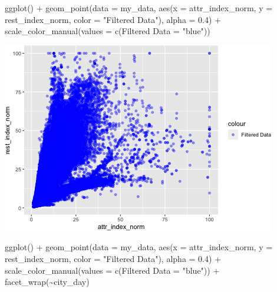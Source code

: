 \documentclass[
]{article}
\newenvironment{Shaded}{\begin{snugshade}}{\end{snugshade}}
\newcommand{\AttributeTok}[1]{\textcolor[rgb]{0.77,0.63,0.00}{#1}}
\newcommand{\FloatTok}[1]{\textcolor[rgb]{0.00,0.00,0.81}{#1}}
\newcommand{\FunctionTok}[1]{\textcolor[rgb]{0.00,0.00,0.00}{#1}}
\newcommand{\NormalTok}[1]{#1}
\newcommand{\OtherTok}[1]{\textcolor[rgb]{0.56,0.35,0.01}{#1}}
\newcommand{\SpecialCharTok}[1]{\textcolor[rgb]{0.00,0.00,0.00}{#1}}
\newcommand{\StringTok}[1]{\textcolor[rgb]{0.31,0.60,0.02}{#1}}
\begin{document}
\begin{Shaded}
\begin{Highlighting}[]
\FunctionTok{ggplot}\NormalTok{() }\SpecialCharTok{+} \FunctionTok{geom\_point}\NormalTok{(}\AttributeTok{data =}\NormalTok{ my\_data, }\FunctionTok{aes}\NormalTok{(}\AttributeTok{x =}\NormalTok{ attr\_index\_norm,}
    \AttributeTok{y =}\NormalTok{ rest\_index\_norm, }\AttributeTok{color =} \StringTok{"Filtered Data"}\NormalTok{), }\AttributeTok{alpha =} \FloatTok{0.4}\NormalTok{) }\SpecialCharTok{+}
    \FunctionTok{scale\_color\_manual}\NormalTok{(}\AttributeTok{values =} \FunctionTok{c}\NormalTok{(}\StringTok{\textasciigrave{}}\AttributeTok{Filtered Data}\StringTok{\textasciigrave{}} \OtherTok{=} \StringTok{"blue"}\NormalTok{))}
\end{Highlighting}
\end{Shaded}

\includegraphics{Project_files/figure-latex/unnamed-chunk-36-3.png}

\begin{Shaded}
\begin{Highlighting}[]
\FunctionTok{ggplot}\NormalTok{() }\SpecialCharTok{+} \FunctionTok{geom\_point}\NormalTok{(}\AttributeTok{data =}\NormalTok{ my\_data, }\FunctionTok{aes}\NormalTok{(}\AttributeTok{x =}\NormalTok{ attr\_index\_norm,}
    \AttributeTok{y =}\NormalTok{ rest\_index\_norm, }\AttributeTok{color =} \StringTok{"Filtered Data"}\NormalTok{), }\AttributeTok{alpha =} \FloatTok{0.4}\NormalTok{) }\SpecialCharTok{+}
    \FunctionTok{scale\_color\_manual}\NormalTok{(}\AttributeTok{values =} \FunctionTok{c}\NormalTok{(}\StringTok{\textasciigrave{}}\AttributeTok{Filtered Data}\StringTok{\textasciigrave{}} \OtherTok{=} \StringTok{"blue"}\NormalTok{)) }\SpecialCharTok{+}
    \FunctionTok{facet\_wrap}\NormalTok{(}\SpecialCharTok{\textasciitilde{}}\NormalTok{city\_day)}
\end{Highlighting}
\end{Shaded}
\end{document}
